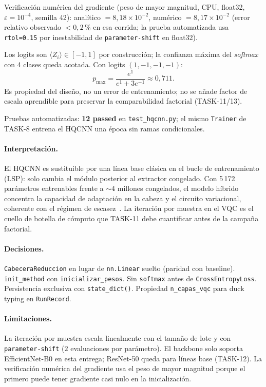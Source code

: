 Verificación numérica del gradiente (peso de mayor magnitud, CPU, float32,
$\varepsilon=10^{-4}$, semilla 42): analítico $= 8{,}18\times10^{-2}$, numérico
$= 8{,}17\times10^{-2}$ (error relativo observado $< 0{,}2$\,\% en esa corrida; la
prueba automatizada usa \texttt{rtol=0.15} por inestabilidad de \texttt{parameter-shift}
en float32).

Los logits son $\langle Z_i\rangle \in [-1,1]$ por construcción; la confianza máxima
del \textit{softmax} con 4 clases queda acotada. Con logits $(1,-1,-1,-1)$:
\[
p_{\max} = \frac{e^{1}}{e^{1}+3e^{-1}} \approx 0{,}711.
\]
Es propiedad del diseño, no un error de entrenamiento; no se añade factor de escala
aprendible para preservar la comparabilidad factorial (TASK-11/13).

Pruebas automatizadas: \textbf{12 passed} en \texttt{test\_hqcnn.py}; el mismo
\texttt{Trainer} de TASK-8 entrena el HQCNN una época sin ramas condicionales.

\paragraph{Interpretación.}
El HQCNN es sustituible por una línea base clásica en el bucle de entrenamiento (LSP):
solo cambia el módulo posterior al extractor congelado. Con 5\,172 parámetros
entrenables frente a $\sim 4$ millones congelados, el modelo híbrido concentra la
capacidad de adaptación en la cabeza y el circuito variacional, coherente con el
régimen de escasez~\cite{mari2020transfer}. La iteración por muestra en el VQC es el
cuello de botella de cómputo que TASK-11 debe cuantificar antes de la campaña factorial.

\paragraph{Decisiones.}
\texttt{CabeceraReduccion} en lugar de \texttt{nn.Linear} suelto (paridad con baseline).
\texttt{init\_method} con \texttt{inicializar\_pesos}. Sin \texttt{softmax} antes de
\texttt{CrossEntropyLoss}. Persistencia exclusiva con \texttt{state\_dict()}. Propiedad
\texttt{n\_capas\_vqc} para duck typing en \texttt{RunRecord}.

\paragraph{Limitaciones.}
La iteración por muestra escala linealmente con el tamaño de lote y con
\texttt{parameter-shift} ($2$ evaluaciones por parámetro). El backbone solo soporta
EfficientNet-B0 en esta entrega; ResNet-50 queda para líneas base (TASK-12). La
verificación numérica del gradiente usa el peso de mayor magnitud porque el primero
puede tener gradiente casi nulo en la inicialización.

